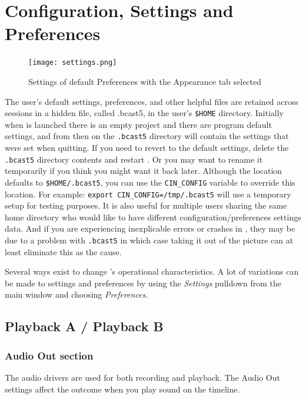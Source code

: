 
\chapter{Configuration, Settings and Preferences}%
\label{cha:configuration_settings_preferences}

\begin{figure}[htpb]
    \centering \texttt{[image: settings.png]}
    \caption{Settings of default Preferences with the Appearance tab selected}
    \label{fig:settings}
\end{figure}

The user's default settings, preferences, and other helpful files are retained across sessions in a hidden file, called .bcast5, in the user’s \texttt{\$HOME} directory. Initially when \CGG{} is launched there is an empty project and there are program default settings, and from then on the \texttt{.bcast5} directory will contain the settings that were set when quitting.  If you need to revert to the default settings, delete the \texttt{.bcast5} directory contents and restart \CGG{}.  Or you may want to rename it temporarily if you think you might want it back later.
Although the location defaults to \texttt{\$HOME/.bcast5}, you can use the \texttt{CIN\_CONFIG} variable to override this location.  For example:  \texttt{export CIN\_CONFIG=/tmp/.bcast5}  will use a temporary setup for testing purposes.  It is also useful for multiple users sharing the same home directory who would like to have different configuration/preferences settings data.  And if you are experiencing inexplicable errors or crashes in \CGG{}, they may be due to a problem with \texttt{.bcast5} in which case taking it out of the picture  can at least eliminate this as the cause.

Several ways exist to change \CGG{}’s operational characteristics.  A lot of variations can be made to  settings and preferences by using the \textit{Settings} pulldown from the main window and choosing \textit{Preferences}.

\section{Playback A / Playback B}%
\label{sec:playback_a_b}

\subsection{Audio Out section}%
\label{sub:audio_out_section}

The audio drivers are used for both recording and playback. The Audio Out settings affect the outcome when you play sound on the timeline.

